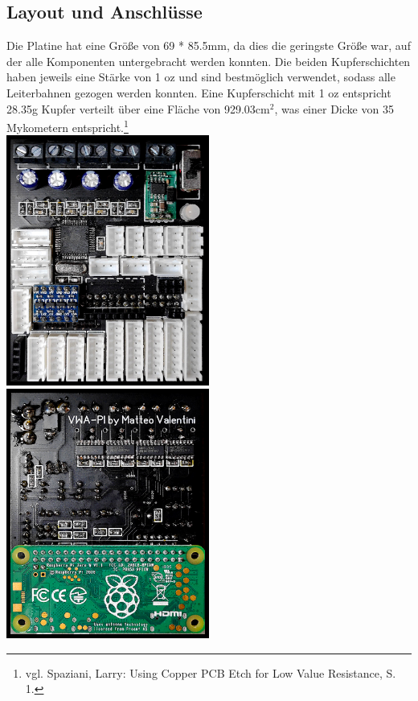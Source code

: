 \documentclass[12pt]{article}
\begin{document}
\subsection{Layout und Anschlüsse}
Die Platine hat eine Größe von 69 * 85.5mm, da dies die geringste Größe war, auf der alle Komponenten untergebracht werden konnten. Die beiden Kupferschichten haben jeweils eine Stärke von 1 oz und sind bestmöglich verwendet, sodass alle Leiterbahnen gezogen werden konnten. Eine Kupferschicht mit 1 oz entspricht 28.35g Kupfer verteilt über eine Fläche von 929.03cm$^2$, was einer Dicke von 35 Mykometern entspricht.\footnote{\selectfont vgl. Spaziani, Larry: Using Copper PCB Etch for Low Value Resistance, S. 1. }\\
\includegraphics[width=0.5\textwidth]{img/vwa1.png}
\includegraphics[width=0.5\textwidth]{img/vwa2.png}
\begin{center}\end{center}
\end{document}

